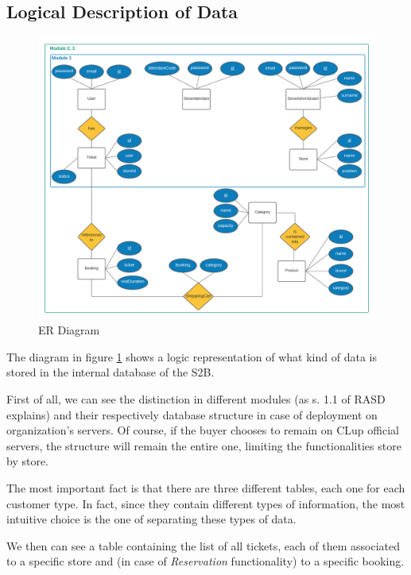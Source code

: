 \documentclass[table, 12pt]{article}
\begin{document}
\subsection{Logical Description of Data}
\begin{figure}[H]
    \begin{center}
        \includegraphics[width=\textwidth]{assets/Architectural-Design/ER.png}
        \caption{ER Diagram}
        \label{er_diagram}
    \end{center}
\end{figure}
The diagram in figure \ref{er_diagram} shows a logic representation of what kind of data is stored in the internal database of the S2B.

First of all, we can see the distinction in different modules (as s. 1.1 of RASD explains) and their respectively database structure in case of deployment on organization's servers. Of course, if the buyer chooses to remain on CLup official servers, the structure will remain the entire one, limiting the functionalities store by store.

The most important fact is that there are three different tables, each one for each customer type. In fact, since they contain different types of information, the most intuitive choice is the one of separating these types of data.

We then can see a table containing the list of all tickets, each of them associated to a specific store and (in case of \textit{Reservation} functionality) to a specific booking.
\end{document}
